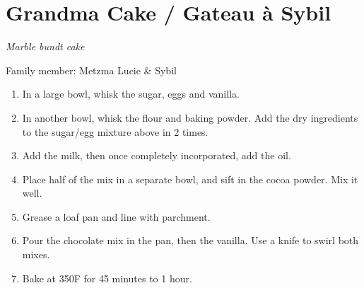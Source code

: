 \chapter{Grandma Cake / Gateau à Sybil}
\label{ch:grandma_cake}
\textit{Marble bundt cake}

Family member: Metzma Lucie \& Sybil


\begin{enumerate}
    \item In a large bowl, whisk the sugar, eggs and vanilla.
    \item In another bowl, whisk the flour and baking powder. Add the dry ingredients to the sugar/egg mixture above in 2 times.
    \item Add the milk, then once completely incorporated, add the oil.
    \item Place half of the mix in a separate bowl, and sift in the cocoa powder. Mix it well.
    \item Grease a loaf pan and line with parchment. 
    \item Pour the chocolate mix in the pan, then the vanilla. Use a knife to swirl both mixes.
    \item Bake at 350\degree F for 45 minutes to 1 hour.
\end{enumerate}


